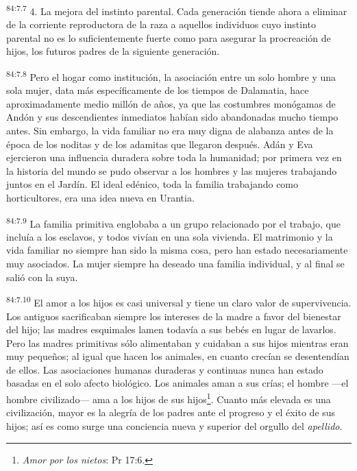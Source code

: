 \documentclass[twoside, 11pt]{book}
\begin{document}
\par
\textsuperscript{84:7.7} 4. La mejora del instinto parental. Cada generación tiende ahora a eliminar de la corriente reproductora de la raza a aquellos individuos cuyo instinto parental no es lo suficientemente fuerte como para asegurar la procreación de hijos, los futuros padres de la siguiente generación.

\par
\textsuperscript{84:7.8} Pero el hogar como institución, la asociación entre un solo hombre y una sola mujer, data más específicamente de los tiempos de Dalamatia, hace aproximadamente medio millón de años, ya que las costumbres monógamas de Andón y sus descendientes inmediatos habían sido abandonadas mucho tiempo antes. Sin embargo, la vida familiar no era muy digna de alabanza antes de la época de los noditas y de los adamitas que llegaron después. Adán y Eva ejercieron una influencia duradera sobre toda la humanidad; por primera vez en la historia del mundo se pudo observar a los hombres y las mujeres trabajando juntos en el Jardín. El ideal edénico, toda la familia trabajando como horticultores, era una idea nueva en Urantia.

\par
\textsuperscript{84:7.9} La familia primitiva englobaba a un grupo relacionado por el trabajo, que incluía a los esclavos, y todos vivían en una sola vivienda. El matrimonio y la vida familiar no siempre han sido la misma cosa, pero han estado necesariamente muy asociados. La mujer siempre ha deseado una familia individual, y al final se salió con la suya.

\par
\textsuperscript{84:7.10} El amor a los hijos es casi universal y tiene un claro valor de supervivencia. Los antiguos sacrificaban siempre los intereses de la madre a favor del bienestar del hijo; las madres esquimales lamen todavía a sus bebés en lugar de lavarlos. Pero las madres primitivas sólo alimentaban y cuidaban a sus hijos mientras eran muy pequeños; al igual que hacen los animales, en cuanto crecían se desentendían de ellos. Las asociaciones humanas duraderas y continuas nunca han estado basadas en el solo afecto biológico. Los animales aman a sus crías; el hombre ---el hombre civilizado--- ama a los hijos de sus hijos\footnote{\textit{Amor por los nietos}: Pr 17:6.}. Cuanto más elevada es una civilización, mayor es la alegría de los padres ante el progreso y el éxito de sus hijos; así es como surge una conciencia nueva y superior del orgullo del \textit{apellido}.
\end{document}
